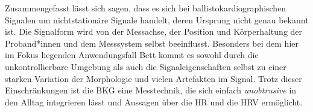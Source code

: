 	
	Zusammengefasst lässt sich sagen, dass es sich bei ballistokardiographischen Signalen um nichtstationäre Signale handelt, deren Ursprung nicht genau bekannt ist. Die Signalform wird von der Messachse, der Position und Körperhaltung der Proband*innen und dem Messsystem selbst beeinflusst. Besonders bei dem hier im Fokus liegenden Anwendungsfall Bett kommt es sowohl durch die unkontrollierbare Umgebung als auch die Signaleigenschaften selbst zu einer starken Variation der Morphologie und vielen Artefakten im Signal. Trotz dieser Einschränkungen ist die \acl{BKG} eine Messtechnik, die sich einfach \textit{unobtrusive} in den Alltag integrieren lässt und Aussagen über die \acl{HR} und die \acl{HRV} ermöglicht.

